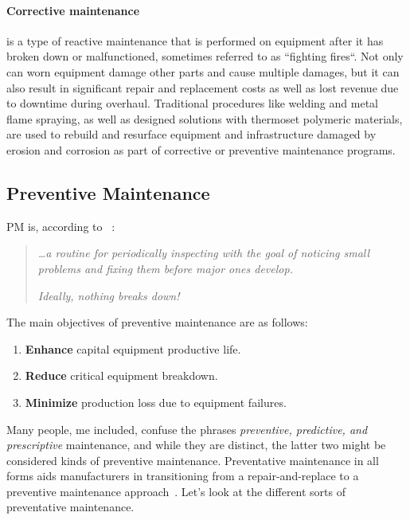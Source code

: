 \paragraph{Corrective maintenance} is a type of reactive maintenance that is performed on equipment after it has broken down or malfunctioned,
sometimes referred to as ``fighting fires``. Not only can worn equipment damage other parts and cause multiple damages, but it can also result in significant repair and
replacement costs as well as lost revenue due to downtime during overhaul. Traditional procedures like welding and metal flame spraying,
as well as designed solutions with thermoset polymeric materials, are used to rebuild and resurface equipment and infrastructure
damaged by erosion and corrosion as part of corrective or preventive maintenance programs.

\subsection{Preventive Maintenance}
\ac{PM} is, according to \citeauthor{Article:nyt_hinds_1985_preventive}~\cite{Article:nyt_hinds_1985_preventive}:
\begin{quote}
    \textit{\dots a routine for periodically inspecting with the goal of noticing small problems and fixing them before major ones develop.}

    \textit{Ideally, nothing breaks down!}
\end{quote}

The main objectives of preventive maintenance are as follows:
\begin{enumerate}
    \item \textbf{Enhance} capital equipment productive life.
    \item \textbf{Reduce} critical equipment breakdown.
    \item \textbf{Minimize} production loss due to equipment failures.
\end{enumerate}
Many people, me included, confuse the phrases \textit{preventive, predictive, and prescriptive} maintenance, and while they are distinct, the latter two might
be considered kinds of preventive maintenance. Preventative maintenance in all forms aids manufacturers in transitioning from a
repair-and-replace to a preventive maintenance approach~\cite{Misc:trout_2019_preventive}. Let's look at the different sorts of preventative maintenance.

